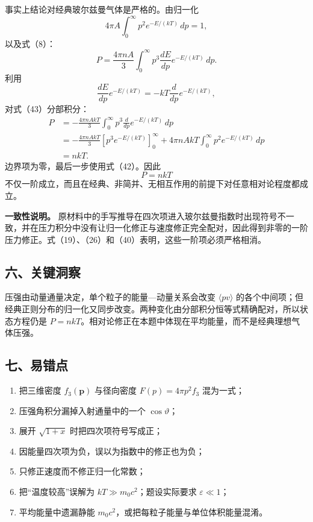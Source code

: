 \documentclass[12pt,a4paper,UTF8]{ctexart}
\newcommand{\tightlist}{\setlength{\itemsep}{0pt}\setlength{\parskip}{0pt}}
\begin{document}
事实上结论对经典玻尔兹曼气体是严格的。由归一化 \[
4\pi A\int_0^\infty p^2e^{-E/(kT)}\,dp=1, \tag{42}
\] 以及式（8）： \[
P=\frac{4\pi nA}{3}
\int_0^\infty p^3\frac{dE}{dp}
e^{-E/(kT)}\,dp. \tag{43}
\] 利用 \[
\frac{dE}{dp}e^{-E/(kT)}
=-kT\frac d{dp}e^{-E/(kT)}, \tag{44}
\] 对式（43）分部积分： \[
\begin{aligned}
P
&=-\frac{4\pi nAkT}{3}
\int_0^\infty p^3
\frac d{dp}e^{-E/(kT)}\,dp\\
&=-\frac{4\pi nAkT}{3}
\left[p^3e^{-E/(kT)}\right]_0^\infty
+4\pi nAkT
\int_0^\infty p^2e^{-E/(kT)}\,dp\\
&=nkT.
\end{aligned} \tag{45}
\] 边界项为零，最后一步使用式（42）。因此 \[
\boxed{P=nkT}
\]
不仅一阶成立，而且在经典、非简并、无相互作用的前提下对任意相对论程度都成立。

\textbf{一致性说明。}
原材料中的手写推导在四次项进入玻尔兹曼指数时出现符号不一致，并在压力积分中没有让归一化修正与速度修正完全配对，因此得到非零的一阶压力修正。式（19）、（26）和（40）表明，这些一阶项必须严格相消。

\subsection{六、关键洞察}\label{ux516dux5173ux952eux6d1eux5bdf-7}

压强由动量通量决定，单个粒子的能量---动量关系会改变
\(\langle pv\rangle\)
的各个中间项；但经典正则分布的归一化又同步改变。两种变化由分部积分恒等式精确配对，所以状态方程仍是
\(P=nkT\)。相对论修正在本题中体现在平均能量，而不是经典理想气体压强。

\subsection{七、易错点}\label{ux4e03ux6613ux9519ux70b9-7}

\begin{enumerate}
\def\labelenumi{\arabic{enumi}.}
\tightlist
\item
  把三维密度 \(f_3(\boldsymbol p)\) 与径向密度 \(F(p)=4\pi p^2f_3\)
  混为一式；
\item
  压强角积分漏掉入射通量中的一个 \(\cos\vartheta\)；
\item
  展开 \(\sqrt{1+x}\) 时把四次项符号写成正；
\item
  因能量四次项为负，误以为指数中的修正也为负；
\item
  只修正速度而不修正归一化常数；
\item
  把``温度较高''误解为 \(kT\gg m_0c^2\)；题设实际要求
  \(\varepsilon\ll1\)；
\item
  平均能量中遗漏静能 \(m_0c^2\)，或把每粒子能量与单位体积能量混淆。
\end{enumerate}
\end{document}
